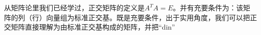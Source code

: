 

\begin{issues}
\issueTODO
\end{issues}

从矩阵论里我们已经学过，正交矩阵的定义是$A^T A=E$。并有充要条件为：该矩阵的列（行）向量组为标准正交基。既是充要条件，出于实用角度，我们可以把正交矩阵直接理解为由标准正交基构成的矩阵，并把“din”